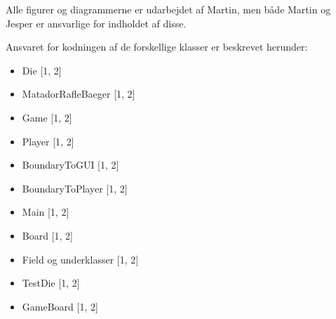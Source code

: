 Alle figurer og diagrammerne er udarbejdet af Martin, men både Martin og Jesper er ansvarlige for indholdet af disse.

Ansvaret for kodningen af de forskellige klasser er beskrevet herunder:
\begin{itemize}
\item Die [1, 2]
\item MatadorRafleBaeger [1, 2]
\item Game [1, 2]
\item Player [1, 2]
\item BoundaryToGUI [1, 2]
\item BoundaryToPlayer [1, 2]
\item Main [1, 2]
\item Board [1, 2]
\item Field og underklasser [1, 2]
\item TestDie [1, 2]
\item GameBoard [1, 2]
\end{itemize}